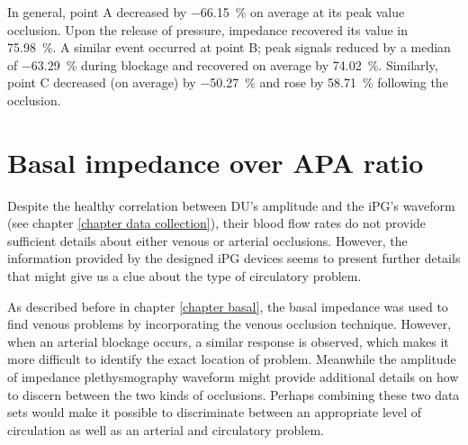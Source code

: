 In general, point A decreased by \SI{-66.15}{\percent} on average at its peak value occlusion. Upon the release of pressure, impedance recovered its value in \SI{75.98}{\percent}. A similar event occurred at point B; peak signals reduced by a median of \SI{-63.29}{\percent} during blockage and recovered on average by \SI{74.02}{\percent}. Similarly, point C decreased (on average) by \SI{-50.27}{\percent} and rose by \SI{58.71}{\percent} following the occlusion.

\section{Basal impedance over APA ratio} %
\label{section discussion 4}

Despite the healthy correlation between DU's amplitude and the iPG's waveform (see chapter \ref{chapter data collection}), their blood flow rates do not provide sufficient details about either venous or arterial occlusions. However, the information provided by the designed iPG devices seems to present further details that might give us a clue about the type of circulatory problem. 

As described before in chapter \ref {chapter basal}, the basal impedance was used to find venous problems by incorporating the venous occlusion technique. However, when an arterial blockage occurs, a similar response is observed, which makes it more difficult to identify the exact location of problem. Meanwhile the amplitude of impedance plethysmography waveform might provide additional details on how to discern between the two kinds of occlusions. Perhaps combining these two data sets would make it possible to discriminate between an appropriate level of circulation as well as an arterial and circulatory problem. 


